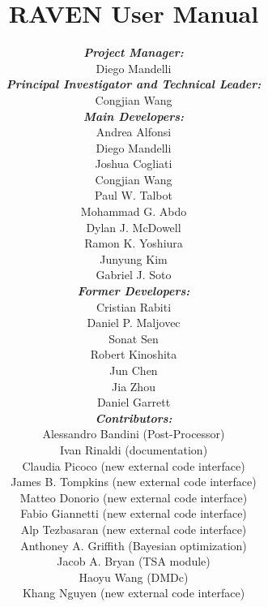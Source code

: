 \documentclass[pdf,12pt]{INLreport}
\title{RAVEN User Manual}
\author{
\textbf{\textit{Project Manager:}}
 \\Diego Mandelli\\
 \textbf{\textit{Principal Investigator and Technical Leader:}}
 \\Congjian Wang\\
\textbf{\textit{Main Developers:}}
\\Andrea Alfonsi
\\Diego Mandelli
\\Joshua Cogliati
\\Congjian Wang
\\Paul W. Talbot
\\Mohammad G. Abdo
\\Dylan J. McDowell
\\Ramon K. Yoshiura
\\Junyung Kim
\\Gabriel J. Soto\\
\textbf{\textit{Former Developers:}}
\\Cristian Rabiti
\\Daniel P. Maljovec
\\Sonat Sen
\\Robert Kinoshita
\\Jun Chen
\\Jia Zhou
\\Daniel Garrett\\
\textbf{\textit{Contributors:}}
\\Alessandro Bandini (Post-Processor)
\\Ivan Rinaldi (documentation)
\\Claudia Picoco (new external code interface)
\\James B. Tompkins (new external code interface)
\\Matteo Donorio (new external code interface)
\\Fabio Giannetti (new external code interface)
\\Alp Tezbasaran (new external code interface)
\\Anthoney A. Griffith (Bayesian optimization)
\\Jacob A. Bryan (TSA module)
\\Haoyu Wang (DMDc)
\\Khang Nguyen (new external code interface)
}
\date{}
\begin{document}
    \sloppy
    \maketitle

%    







    \cleardoublepage		%
    \tableofcontents




\end{document}
